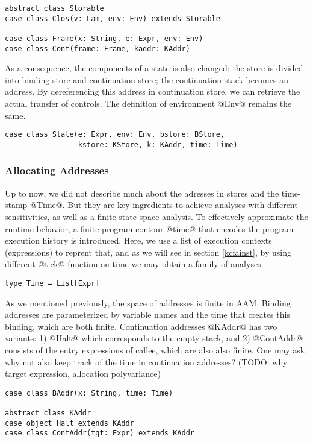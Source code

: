 \documentclass[acmsmall,review,anonymous]{acmart}\settopmatter{printfolios=true,printccs=false,printacmref=false}
\begin{document}
\begin{lstlisting}
abstract class Storable 
case class Clos(v: Lam, env: Env) extends Storable

case class Frame(x: String, e: Expr, env: Env)
case class Cont(frame: Frame, kaddr: KAddr)
\end{lstlisting}

As a consequence, the components of a state is also changed: 
the store is divided into binding store and continuation store;
the continuation stack becomes an address.
By dereferencing this address in continuation store, we can retrieve the 
actual transfer of controls. The definition of environment @Env@
remains the same.

\begin{lstlisting}
case class State(e: Expr, env: Env, bstore: BStore, 
                 kstore: KStore, k: KAddr, time: Time)
\end{lstlisting}

\subsubsection{Allocating Addresses}
Up to now, we did not describe much about the adresses in stores and the 
time-stamp @Time@.
But they are key ingredients to achieve analyses with different sensitivities,
as well as a finite state space analysis.
To effectively approximate the runtime behavior, a finite 
program contour @time@ that encodes the program execution history is introduced.
Here, we use a list of execution contexts (expressions) to reprent that, and
as we will see in section \ref{kcfainst}, by using different @tick@
function on time we may obtain a family of analyses.

\begin{lstlisting}
type Time = List[Expr]
\end{lstlisting}

As we mentioned previously, the space of addresses is finite in AAM.
Binding addresses are parameterized by variable names and the time that creates this binding,
which are both finite.
Continuation addresses @KAddr@ has two variants: 
1) @Halt@ which corresponds to the empty stack, and
2) @ContAddr@ consists of the entry expressions of callee, which are also also
finite.
One may ask, why not also keep track of the time in continuation addresses?
(TODO: why target expression, allocation polyvariance)

\begin{lstlisting}
case class BAddr(x: String, time: Time)

abstract class KAddr
case object Halt extends KAddr
case class ContAddr(tgt: Expr) extends KAddr
\end{lstlisting}
\end{document}
